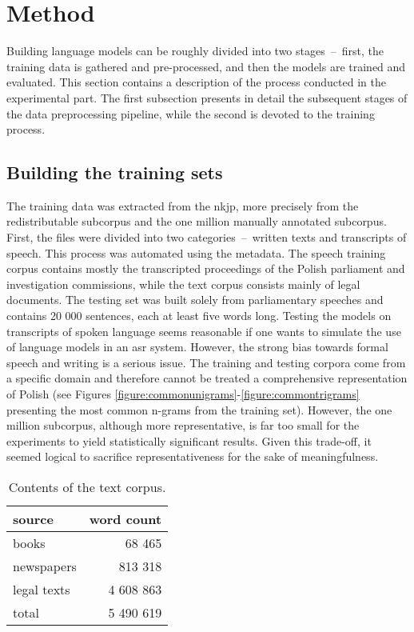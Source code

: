 \section{Method}
\label{section:method}
Building language models can be roughly divided into two stages~--~first, the training data is gathered and pre-processed, and then the models are trained and evaluated. This section contains a description of the process conducted in the experimental part. The first subsection presents in detail the subsequent stages of the data preprocessing pipeline, while the second is devoted to the training process.
\subsection{Building the training sets}
\label{subsection:trainingset}
The training data was extracted from the \gls{nkjp}, more precisely from the redistributable subcorpus and the one million manually annotated subcorpus. First, the files were divided into two categories~--~written texts and transcripts of speech. This process was automated using the metadata. The speech training corpus contains mostly the transcripted proceedings of the Polish parliament and investigation commissions, while the text corpus consists mainly of legal documents. The testing set was built solely from parliamentary speeches and contains 20 000 sentences, each at least five words long. Testing the models on transcripts of spoken language seems reasonable if one wants to simulate the use of language models in an \gls{asr} system. However, the strong bias towards formal speech and writing is a serious issue. The training and testing corpora come from a specific domain and therefore cannot be treated a comprehensive representation of Polish (see Figures \ref{figure:commonunigrams}-\ref{figure:commontrigrams} presenting the most common n-grams from the training set). However, the one million subcorpus, although more representative, is far too small for the experiments to yield statistically significant results. Given this trade-off, it seemed logical to sacrifice representativeness for the sake of meaningfulness.

\begin{table}[!htbp]
	\centering
	\caption[Contents of the text corpus]{Contents of the text corpus.}
	\begin{tabular*}{.6\linewidth}{@{\extracolsep{\fill}}lr}
		source & word count \\
		\midrule
                books & 68 465 \\
                newspapers & 813 318 \\
                legal texts & 4 608 863 \\
                total  & 5 490 619 \\
	\end{tabular*}
\end{table}


